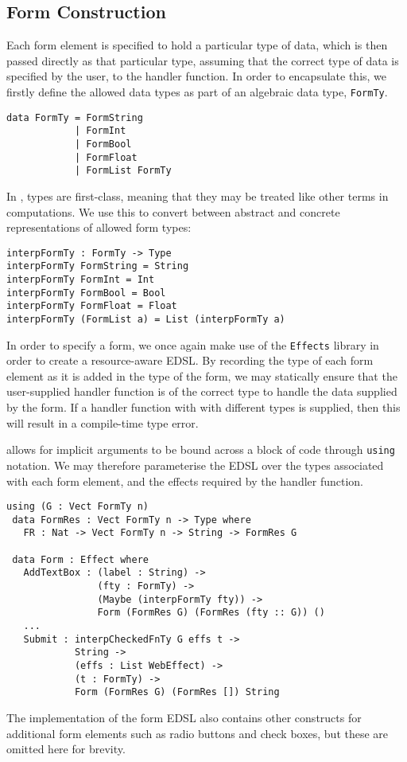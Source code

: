 \documentclass[preprint]{sigplanconf}
\begin{document}
\subsection{Form Construction}
Each form element is specified to hold a particular type of data, which is then passed directly as that particular type, assuming that the correct type of data is specified by the user, to the handler function. In order to encapsulate this, we firstly define the allowed data types as part of an algebraic data type, \texttt{FormTy}.
\begin{verbatim}
data FormTy = FormString
            | FormInt
            | FormBool
            | FormFloat
            | FormList FormTy 
\end{verbatim}
In \idris{}, types are first-class, meaning that they may be treated like other terms in computations. We use this to convert between abstract and concrete representations of allowed form types:
\begin{verbatim}
interpFormTy : FormTy -> Type
interpFormTy FormString = String
interpFormTy FormInt = Int
interpFormTy FormBool = Bool
interpFormTy FormFloat = Float
interpFormTy (FormList a) = List (interpFormTy a)
\end{verbatim}
%
In order to specify a form, we once again make use of the \texttt{Effects} library in order to create a resource-aware EDSL. By recording the type of each form element as it is added in the type of the form, we may statically ensure that the user-supplied handler function is of the correct type to handle the data supplied by the form. If a handler function with with different types is supplied, then this will result in a compile-time type error.

\idris{} allows for implicit arguments to be bound across a block of code through \texttt{using} notation. We may therefore parameterise the EDSL over the types associated with each form element, and the effects required by the handler function.

{\small
\begin{verbatim}
using (G : Vect FormTy n)
 data FormRes : Vect FormTy n -> Type where
   FR : Nat -> Vect FormTy n -> String -> FormRes G

 data Form : Effect where
   AddTextBox : (label : String) -> 
                (fty : FormTy) -> 
                (Maybe (interpFormTy fty)) -> 
                Form (FormRes G) (FormRes (fty :: G)) () 
   ...
   Submit : interpCheckedFnTy G effs t -> 
            String -> 
            (effs : List WebEffect) -> 
            (t : FormTy) -> 
            Form (FormRes G) (FormRes []) String
\end{verbatim}
}
The implementation of the form EDSL also contains other constructs for additional form elements such as radio buttons and check boxes, but these are omitted here for brevity.
\end{document}
